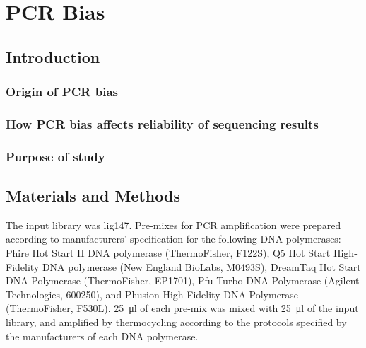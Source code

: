 \documentclass[parskip=full, numbers=noenddot]{scrreprt}
\begin{document}
\chapter{PCR Bias}
\label{ch:pcrbias}

\section{Introduction}
\label{sec:pcrbias_intro}

\subsection{Origin of PCR bias}
\label{ssec:pcrbias_intro_origin}

\subsection{How PCR bias affects reliability of sequencing results}
\label{ssec:pcrbias_intro_effects}

\subsection{Purpose of study}
\label{ssec:pcrbias_intro_why}

\section{Materials and Methods}
\label{sec:pcrbias_methods}

The input library was lig147. Pre-mixes for PCR amplification were prepared according to manufacturers' specification for the following DNA polymerases: Phire Hot Start II DNA polymerase (ThermoFisher, F122S), Q5 Hot Start High-Fidelity DNA polymerase (New England BioLabs, M0493S), DreamTaq Hot Start DNA Polymerase (ThermoFisher, EP1701), Pfu Turbo DNA Polymerase (Agilent Technologies, 600250), and Phusion High-Fidelity DNA Polymerase (ThermoFisher, F530L). \SI{25}{\micro\litre} of each pre-mix was mixed with \SI{25}{\micro\litre} of the input library, and amplified by thermocycling according to the protocols specified by the manufacturers of each DNA polymerase.
\end{document}
